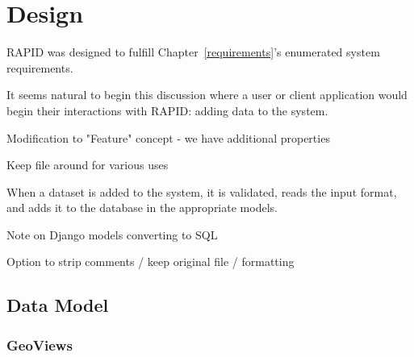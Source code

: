 \chapter{Design}
\label{design}

RAPID was designed to fulfill Chapter~\ref{requirements}'s enumerated system requirements.

It seems natural to begin this discussion where a user or client application would begin their interactions with RAPID: adding data to the system.



Modification to "Feature" concept - we have additional properties

Keep file around for various uses

When a dataset is added to the system, it is validated, reads the input format, and adds it to the database in the appropriate models.

Note on Django models converting to SQL

Option to strip comments / keep original file / formatting



\section{Data Model}



\subsection{GeoViews}


\label{design_srid}
